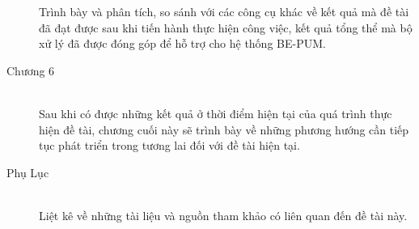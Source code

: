 \begin{description}
	 Trình bày và phân tích, so sánh với các công cụ khác về kết quả mà đề tài đã đạt được sau khi tiến hành thực hiện công việc, kết quả tổng thể mà bộ xử lý đã được đóng góp để hỗ trợ cho hệ thống BE-PUM.\\
	\item[Chương 6] \hfill \\
	 Sau khi có được những kết quả ở thời điểm hiện tại của quá trình thực hiện đề tài, chương cuối này sẽ trình bày về những phương hướng cần tiếp tục phát triển trong tương lai đối với đề tài hiện tại.\\
	\item[Phụ Lục] \hfill \\
	 Liệt kê về những tài liệu và nguồn tham khảo có liên quan đến đề tài này.\\
\end{description}
